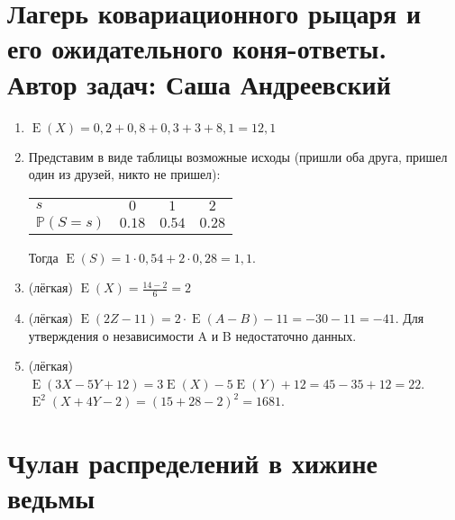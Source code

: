 \documentclass[a4paper,12pt]{article}
\DeclareMathOperator{\E}{E}
\def \P{\mathbb{P}}
\begin{document}
\newpage
\section{Лагерь ковариационного рыцаря и его ожидательного коня-ответы. Автор задач: Саша Андреевский}

\begin{enumerate}
\item $\E(X)=0,2+0,8+0,3+3+8,1=12,1$
\item Представим в виде таблицы возможные исходы (пришли оба друга, пришел один из друзей, никто не пришел):

\begin{center}\begin{tabular}{lccc}
\toprule
 $s$     & $0$  & $1$   & $2$ \\
$\P(S=s)$ & $0.18$ & $0.54$ & $0.28$\\
\bottomrule
\end{tabular}\end{center}

Тогда $\E(S)={1}\cdot{0,54}+{2}\cdot{0,28}=1,1$.
\item (лёгкая) $\E(X)=\frac{14-2}{6}=2$
\item (лёгкая) $\E(2Z-11)={2}\cdot{\E(A-B)}-11=-30-11=-41$. Для утверждения о независимости A и B недостаточно данных.
\item (лёгкая) $\E(3X-5Y+12)=3\E(X)-5\E(Y)+12=45-35+12=22$. $\E^2(X+4Y-2)=(15+28-2)^2=1681$.
\end{enumerate}





\newpage
\section{Чулан распределений в хижине ведьмы} %
\end{document}
